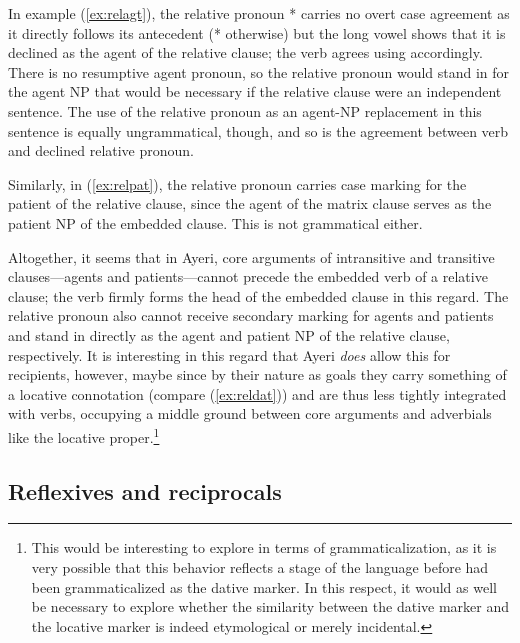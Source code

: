 In example (\ref{ex:relagt}), the relative pronoun * carries 
no overt case agreement as it directly follows its antecedent 
(* otherwise) but the long vowel shows that it is declined 
as the agent of the relative clause; the verb agrees using  
accordingly. There is no resumptive agent pronoun, so the relative pronoun 
would stand in for the agent NP that would be necessary if the relative clause 
were an independent sentence. The use of the relative pronoun as an agent-NP 
replacement in this sentence is equally ungrammatical, though, and so is the 
agreement between verb and declined relative pronoun.

Similarly, in (\ref{ex:relpat}), the relative pronoun carries case marking for 
the patient of the relative clause, since the agent of the matrix clause serves 
as the patient NP of the embedded clause. This is not grammatical either.

Altogether, it seems that in Ayeri, core arguments of intransitive and 
transitive clauses---agents and patients---cannot precede the embedded verb of 
a relative clause; the verb firmly forms the head of the embedded clause in 
this regard. The relative pronoun also cannot receive secondary marking for 
agents and patients and stand in directly as the agent and patient NP of the 
relative clause, respectively. It is interesting in this regard that Ayeri 
\emph{does} allow this for recipients, however, maybe since by their nature as 
goals they carry something of a locative connotation (compare 
(\ref{ex:reldat})) and are thus less tightly integrated with verbs, occupying a 
middle ground between core arguments and adverbials like the locative 
proper.\footnote{This would be interesting to explore in terms of 
grammaticalization, as it is very possible that this behavior reflects a stage 
of the language before  had been grammaticalized as the dative 
marker. In this respect, it would as well be necessary to explore whether the 
similarity between the dative marker  and the locative marker 
 is indeed etymological or merely incidental.}


\subsection{Reflexives and reciprocals}


